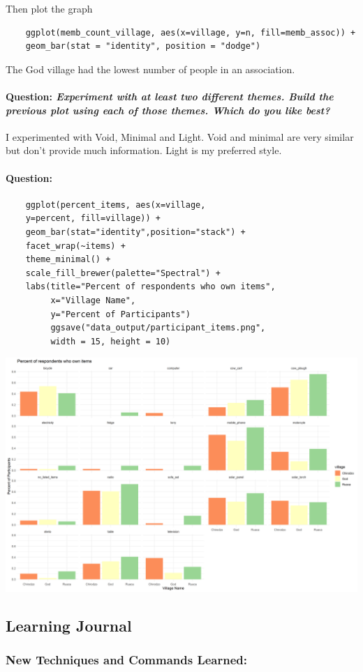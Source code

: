 \documentclass[12pt]{article}
\newcommand{\question}[1]{\paragraph{Question: {\textnormal{\textit{#1}}} ~\\}}
\begin{document}
Then plot the graph
\begin{verbatim}
    ggplot(memb_count_village, aes(x=village, y=n, fill=memb_assoc)) +
    geom_bar(stat = "identity", position = "dodge")
\end{verbatim}
The God village had the lowest number of people in an association.
\question{Experiment with at least two different themes. Build the previous plot using each of those themes. Which do you like best?}
I experimented with Void, Minimal and Light. Void and minimal are very similar but don't provide much information. Light is my preferred style.

\question{}
\begin{verbatim}
    ggplot(percent_items, aes(x=village, 
    y=percent, fill=village)) + 
    geom_bar(stat="identity",position="stack") +
    facet_wrap(~items) +
    theme_minimal() +
    scale_fill_brewer(palette="Spectral") +
    labs(title="Percent of respondents who own items",
         x="Village Name",
         y="Percent of Participants")
         ggsave("data_output/participant_items.png",
         width = 15, height = 10)
\end{verbatim}
\begin{landscape}
\includegraphics[scale=0.6]{participant}
\end{landscape}
\subsection{Learning Journal}

\subsubsection{New Techniques and Commands Learned:}
\end{document}
